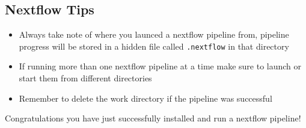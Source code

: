 \documentclass[11pt]{article}
\providecommand{\tightlist}{%
      \setlength{\itemsep}{0pt}\setlength{\parskip}{0pt}}
\begin{document}
    \hypertarget{nextflow-tips}{%
\subsection{Nextflow Tips}\label{nextflow-tips}}

\begin{itemize}
\tightlist
\item
  Always take note of where you launced a nextflow pipeline from,
  pipeline progress will be stored in a hidden file called
  \texttt{.nextflow} in that directory
\item
  If running more than one nextflow pipeline at a time make sure to
  launch or start them from different directories
\item
  Remember to delete the work directory if the pipeline was successful
\end{itemize}

    Congratulations you have just successfully installed and run a nextflow
pipeline!


\end{document}
